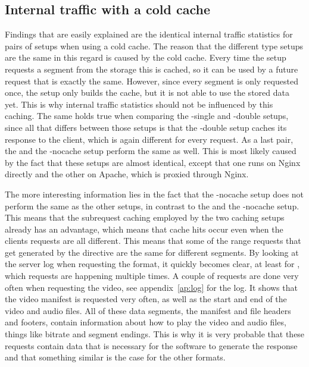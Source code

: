 \documentclass[twoside,openright]{uva-bachelor-thesis}
\begin{document}
\subsection{Internal traffic with a cold cache}
Findings that are easily explained are the identical internal traffic statistics
for pairs of setups when using a cold cache. The reason that the different \cdn
type setups are the same in this regard is caused by the cold cache. Every time
the \cdn setup requests a segment from the storage this is cached, so it can be
used by a future request that is exactly the same. However, since every segment
is only requested once, the \cdn setup only builds the cache, but it is not able
to use the stored data yet. This is why internal traffic statistics should not
be influenced by this caching. The same holds true when comparing the \lt-single
and \lt-double setups, since all that differs between those setups is that the
\lt-double setup caches its response to the client, which is again different for
every request. As a last pair, the \ipp and the \lt-nocache setup perform the
same as well. This is most likely caused by the fact that these setups are
almost identical, except that one runs on Nginx directly and the other on
Apache, which is proxied through Nginx.

The more interesting information lies in the fact that the \lt-nocache setup
does not perform the same as the other \lt setups, in contrast to the \cdn and
the \cdn-nocache setup. This means that the subrequest caching employed by the
two caching \lt setups already has an advantage, which means that cache hits
occur even when the clients requests are all different. This means that some of
the range requests that get generated by the \ipp directive are the same for
different segments. By looking at the server log when requesting the \iss
format, it quickly becomes clear, at least for \iss, which requests are
happening multiple times. A couple of requests are done very often when
requesting the video, see appendix~\ref{ap:log} for the log. It shows that the
video manifest is requested very often, as well as the start and end of the
video and audio files. All of these data segments, the manifest and file headers
and footers, contain information about how to play the video and audio files,
things like bitrate and segment endings. This is why it is very probable that
these requests contain data that is necessary for the \usp software to generate
the \iss response and that something similar is the case for the other formats.
\end{document}

